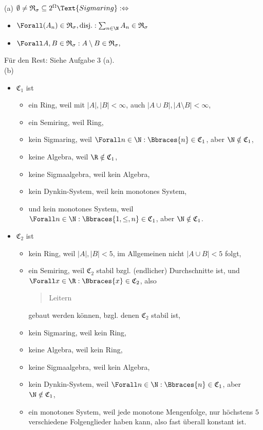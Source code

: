\begin{solution}

(a) $\emptyset \neq \mathfrak{R}_\sigma \subseteq 2^\Omega \Text{Sigmaring} : \Leftrightarrow$
\begin{itemize}
  \item $\Forall (A_n) \in \mathfrak{R}_\sigma, \text{disj.}: \sum_{n \in \N} A_n \in \mathfrak{R}_\sigma$
  \item $\Forall A, B \in \mathfrak{R}_\sigma: A \setminus B \in \mathfrak{R}_\sigma,$
\end{itemize}

Für den Rest: Siehe Aufgabe 3 (a). \\

(b)

\begin{itemize}

  \item $\mathfrak{C}_1$ ist
  \begin{itemize}
    \item ein Ring, weil mit $|A|, |B| < \infty$, auch $|A \cup B|, |A \setminus B| < \infty$,
    \item ein Semiring, weil Ring,
    \item kein Sigmaring, weil $\Forall n \in \N: \Bbraces{n} \in \mathfrak{C}_1$, aber $\N \notin \mathfrak{C}_1$,
    \item keine Algebra, weil $\R \notin \mathfrak{C}_1$,
    \item keine Sigmaalgebra, weil kein Algebra,
    \item kein Dynkin-System, weil kein monotones System,
    \item und kein monotones System, weil $\Forall n \in \N: \Bbraces{1, \leq, n} \in \mathfrak{C}_1$, aber $\N \notin \mathfrak{C}_1$.
  \end{itemize}

  \item$\mathfrak{C}_2$ ist
  \begin{itemize}
    \item kein Ring, weil $|A|, |B| < 5$, im Allgemeinen nicht $|A \cup B| < 5$ folgt,
    \item ein Semiring, weil $\mathfrak{C}_2$ stabil bzgl. (endlicher) Durchschnitte ist, und $\Forall x \in \R: \Bbraces{x} \in \mathfrak{C}_2$, also \blockquote{Leitern} gebaut werden können, bzgl. denen $\mathfrak{C}_2$ stabil ist,
    \item kein Sigmaring, weil kein Ring,
    \item keine Algebra, weil kein Ring,
    \item keine Sigmaalgebra, weil kein Algebra,
    \item kein Dynkin-System, weil $\Forall n \in \N: \Bbraces{n} \in \mathfrak{C}_1$, aber $\N \notin \mathfrak{C}_1$,
    \item ein monotones System, weil jede monotone Mengenfolge, nur höchstens $5$ verschiedene Folgenglieder haben kann, also fast überall konstant ist.
  \end{itemize}


\end{itemize}
\end{solution}

